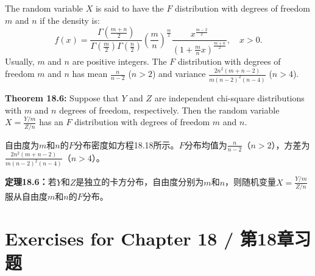 \begin{original}
The random variable $X$ is said to have the $F$ distribution with degrees of freedom $m$ and $n$ if the density is:
\[
f(x) = \frac{\Gamma(\frac{m+n}{2})}{\Gamma(\frac{m}{2})\Gamma(\frac{n}{2})} \left(\frac{m}{n}\right)^{\frac{m}{2}} \frac{x^{\frac{m-2}{2}}}{(1 + \frac{m}{n}x)^{\frac{m+n}{2}}}, \quad x > 0. \tag{18.18}
\]
Usually, $m$ and $n$ are positive integers. The $F$ distribution with degrees of freedom $m$ and $n$ has mean $\frac{n}{n-2}$ ($n > 2$) and variance $\frac{2n^2(m+n-2)}{m(n-2)^2(n-4)}$ ($n > 4$).

\textbf{Theorem 18.6:} Suppose that $Y$ and $Z$ are independent chi-square distributions with $m$ and $n$ degrees of freedom, respectively. Then the random variable $X = \frac{Y/m}{Z/n}$ has an $F$ distribution with degrees of freedom $m$ and $n$.
\end{original}
\begin{translation}
自由度为$m$和$n$的$F$分布密度如方程18.18所示。$F$分布均值为$\frac{n}{n-2}$（$n > 2$），方差为$\frac{2n^2(m+n-2)}{m(n-2)^2(n-4)}$（$n > 4$）。

\textbf{定理18.6：}若$Y$和$Z$是独立的卡方分布，自由度分别为$m$和$n$，则随机变量$X = \frac{Y/m}{Z/n}$服从自由度$m$和$n$的$F$分布。
\end{translation}
\section*{Exercises for Chapter 18 / 第18章习题}

